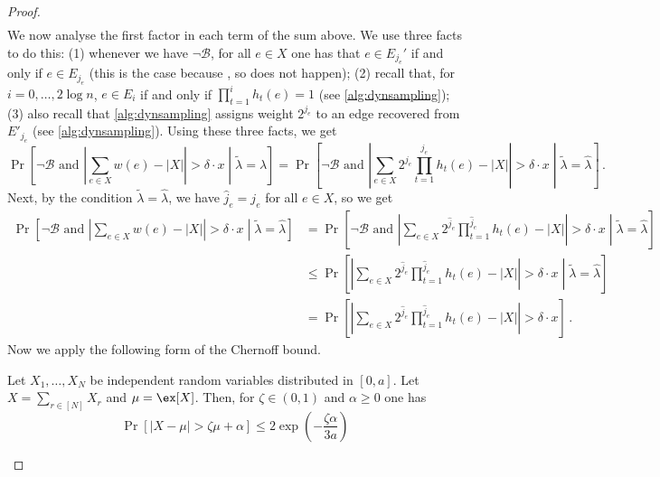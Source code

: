 \begin{proof}
\begin{align*}
	\end{align*}
	We now analyse the first factor in each term of the sum above. We use three facts to do this: (1) whenever we have $\neg \mathcal{B}$, for all $e \in X$ one has that $e \in E_{j_e}'$ if and only if $e \in E_{j_e}$ (this is the case because , so  does not happen); (2) recall that, for $i=0,\dots,2\log n$, $e \in E_{i}$ if and only if $\prod_{t=1}^{i}h_t(e)=1$ (see \cref{alg:dynsampling}); (3) also recall that \cref{alg:dynsampling} assigns weight $2^{j_e}$ to an edge recovered from $E'_{j_e}$ (see \cref{alg:dynsampling}).
	Using these three facts, we get
	\begin{equation*}
		 \Pr\left[\neg \mathcal{B} \text{ and } \left|\sum_{e \in X} w(e) - |X|\right| > \delta \cdot x  \middle| \tilde{\lambda}=\hat{\lambda} \right]
		= \Pr\left[\neg \mathcal{B} \text{ and } \left|\sum_{e \in X} 2^{j_e}\prod_{t=1}^{j_e}h_t(e) - |X|\right| > \delta \cdot x  \middle| \tilde{\lambda}=\hat{\lambda} \right] \, .
	\end{equation*}
	Next, by the condition $\tilde{\lambda}=\hat{\lambda}$, we have $\hat{j}_e=j_e$ for all $e \in X$, so we get
	\begin{align*}
	\Pr\left[\neg \mathcal{B} \text{ and } \left|\sum_{e \in X} w(e) - |X|\right| > \delta \cdot x  \middle| \tilde{\lambda}=\hat{\lambda} \right]
		& =  \Pr\left[\neg \mathcal{B} \text{ and } \left|\sum_{e \in X} 2^{\hat{j}_e}\prod_{t=1}^{\hat{j}_e}h_t(e) - |X|\right| > \delta \cdot x  \middle| \tilde{\lambda}=\hat{\lambda} \right] \\
		& \le \Pr\left[\left|\sum_{e \in X} 2^{\hat{j}_e}\prod_{t=1}^{\hat{j}_e}h_t(e) - |X|\right| > \delta \cdot x  \middle| \tilde{\lambda}=\hat{\lambda} \right] \\
		& = \Pr\left[\left|\sum_{e \in X} 2^{\hat{j}_e}\prod_{t=1}^{\hat{j}_e}h_t(e) - |X|\right| > \delta \cdot x \right]  \, .
	\end{align*}
	Now we apply the following form of the Chernoff bound.
	\begin{fact}
		Let $X_1,\dots,X_N$ be independent random variables distributed in $[0,a]$. Let $X= \sum_{r \in [N]} X_r$ and $\mu = \ex[X]$. Then, for $\zeta \in (0,1)$ and $\alpha \ge 0$ one has
		\begin{equation*}
			\Pr\left[\left| X- \mu \right| > \zeta \mu+\alpha \right] \le 2 \exp\left(-\frac{\zeta \alpha}{3a}\right)

\end{equation*}
\end{fact}
\end{proof}
